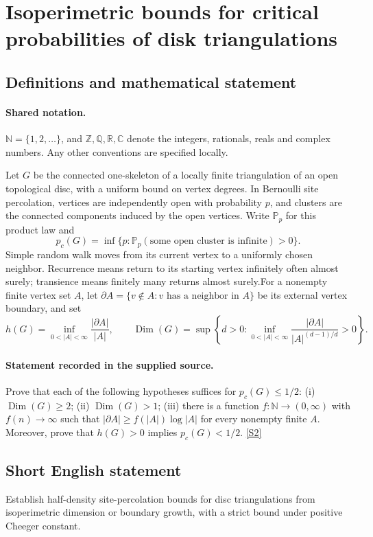 \documentclass[11pt]{article}
\newcommand{\sref}[2]{\hyperlink{source:#1:#2}{[S#2]}}
\begin{document}
\section{Isoperimetric bounds for critical probabilities of disk triangulations}\label{statement}

\subsection{Definitions and mathematical statement}

\paragraph{Shared notation.}$\mathbb N=\{1,2,\ldots\}$, and $\mathbb Z,\mathbb Q,\mathbb R,\mathbb C$ denote the integers, rationals, reals and complex numbers. Any other conventions are specified locally.


Let $G$ be the connected one-skeleton of a locally finite triangulation of an open topological disc, with a uniform bound on vertex degrees. In Bernoulli site percolation, vertices are independently open with probability $p$, and clusters are the connected components induced by the open vertices. Write $\mathbb P_p$ for this product law and
\[p_c(G)=\inf\{p:\mathbb P_p(\text{some open cluster is infinite})>0\}.\]
Simple random walk moves from its current vertex to a uniformly chosen neighbor. Recurrence means return to its starting vertex infinitely often almost surely; transience means finitely many returns almost surely.For a nonempty finite vertex set $A$, let $\partial A=\{v\notin A:v\text{ has a neighbor in }A\}$ be its external vertex boundary, and set
\[h(G)=\inf_{0<|A|<\infty}\frac{|\partial A|}{|A|},\qquad
\operatorname{Dim}(G)=\sup\left\{d>0:\inf_{0<|A|<\infty}\frac{|\partial A|}{|A|^{(d-1)/d}}>0\right\}.\]
\paragraph{Statement recorded in the supplied source.}
Prove that each of the following hypotheses suffices for $p_c(G)\le1/2$: (i) $\operatorname{Dim}(G)\ge2$; (ii) $\operatorname{Dim}(G)>1$; (iii) there is a function $f:\mathbb N\to(0,\infty)$ with $f(n)\to\infty$ such that $|\partial A|\ge f(|A|)\log|A|$ for every nonempty finite $A$. Moreover, prove that $h(G)>0$ implies $p_c(G)<1/2$. \sref{statement}{2}
\subsection{Short English statement}
Establish half-density site-percolation bounds for disc triangulations from isoperimetric dimension or boundary growth, with a strict bound under positive Cheeger constant.
\end{document}
